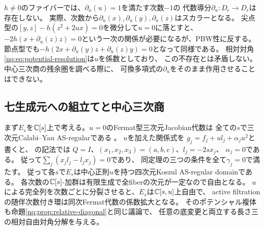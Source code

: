 \begin{remark}[中心方向の通常微分は使えない]\label{nq:rem:no-derivation}
$h\ne0$のファイバーでは、$\partial_u(u)=1$を満たす次数$-1$の
代数導分$\partial_u:D_\epsilon\to D_\epsilon$は存在しない。
実際、次数から$\partial_u(x),\partial_u(y),\partial_u(z)$はスカラーとなる。
尖点型の$[y,z]-h(z^2+2ux)=0$を微分して$u=0$に落とすと、
$-2h(x+\partial_u(z)z)=0$という一次の関係が必要になるが、PBW性に反する。
節点型でも$-h(2x+\partial_u(y)z+\partial_u(z)y)=0$となって同様である。
相対対角\eqref{nq:eq:potential-resolution}は$u$を係数としており、
この不存在とは矛盾しない。中心三次商の残余圏を調べる際に、
可換多項式の$\partial_u$をそのまま作用させることはできない。
\end{remark}

\subsection{七生成元への組立てと中心三次商}
まず$E_s$を$\mathbb C[s]$上で考える。$u=0$のFermat型三次元Jacobian代数は
全ての$s$で三次元Calabi--Yau AS-regularである
\cite[Theorem 4.2(1)]{PMoriSmith}。
$u$を加えた関係式を
$g_j=f_j+u l_j+\alpha_j u^2$と書くと、
\cite[Theorem 3.1.3]{LBSVNE12}の記法では
$Q=I$、$(x_1,x_2,x_3)=(a,b,c)$、$l_j=-2s x_j$、
$\alpha_j=0$である。
従って$\sum_j(x_jl_j-l_jx_j)=0$であり、
同定理の三つの条件を全て$\gamma_j=0$で満たす。
従って各$s$で$E_s$は中心正則$u$を持つ四次元Koszul AS-regular domainである。
各次数の$\mathbb C[s]$-加群は有限生成で全fiberの次元が一定なので自由となる。
$u$による完全列を次数ごとに分裂させると、$E_s$は$\mathbb C[s,u]$上自由で、
active filtrationの随伴次数付き環は同次Fermat代数の係数拡大となる。
そのポテンシャル複体も命題\ref{nq:prop:relative-diagonal}と同じ議論で、
任意の底変更と両立する長さ三の相対自由対角分解を与える。

